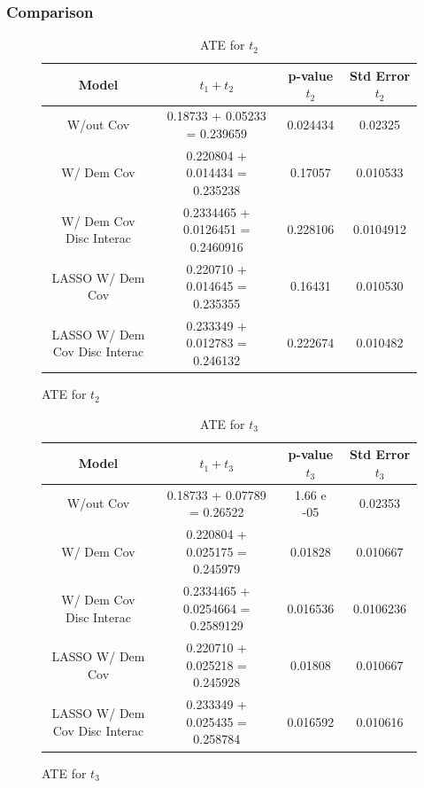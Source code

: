 \documentclass{article}
\begin{document}
\subsubsection*{Comparison}

\begin{figure}[H]
  \begin{table}[H]
  \centering
  \small
  \begin{tabular}{|cccc|}
    \hline
    Model & $t_1 + t_2$ & p-value $t_2$ & Std Error $t_2$ \\
    \hline
    W/out Cov                & 0.18733 + 0.05233 = 0.239659 & 0.024434         & 0.02325 \\ 
    W/ Dem Cov               & 0.220804 + 0.014434 = 0.235238 & 0.17057        & 0.010533 \\   
    W/ Dem Cov Disc Interac  & 0.2334465 + 0.0126451 = 0.2460916 & 0.228106    & 0.0104912 \\       
    LASSO W/ Dem Cov               & 0.220710 + 0.014645 = 0.235355 & 0.16431  & 0.010530 \\         
    LASSO W/ Dem Cov Disc Interac  & 0.233349 + 0.012783 = 0.246132 & 0.222674 & 0.010482 \\         
    \hline
  \end{tabular}
  \caption{ATE for $t_2$}
\end{table}
\end{figure}

\begin{figure}[H]
\begin{table}[H]
  \centering
  \small
  \begin{tabular}{|cccc|}
    \hline
    Model & $t_1 + t_3$ & p-value $t_3$ & Std Error $t_3$ \\
    \hline
    W/out Cov                & 0.18733 + 0.07789 = 0.26522 & 1.66 e -05        & 0.02353 \\
    W/ Dem Cov               & 0.220804 + 0.025175 = 0.245979 & 0.01828        & 0.010667 \\
    W/ Dem Cov Disc Interac  & 0.2334465 + 0.0254664 = 0.2589129 & 0.016536    & 0.0106236 \\
    LASSO W/ Dem Cov               & 0.220710 + 0.025218 = 0.245928 & 0.01808  & 0.010667 \\
    LASSO W/ Dem Cov Disc Interac  & 0.233349 + 0.025435 = 0.258784 & 0.016592 & 0.010616  \\
    \hline
  \end{tabular}
  \caption{ATE for $t_3$}
\end{table}
\end{figure}
\end{document}
